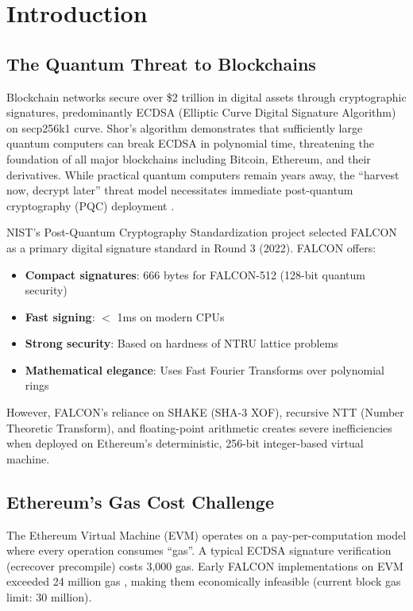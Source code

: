 \section{Introduction}


\subsection{The Quantum Threat to Blockchains}

Blockchain networks secure over \$2 trillion in digital assets through cryptographic signatures, predominantly ECDSA (Elliptic Curve Digital Signature Algorithm) on secp256k1 curve. Shor's algorithm \cite{shor1997polynomial} demonstrates that sufficiently large quantum computers can break ECDSA in polynomial time, threatening the foundation of all major blockchains including Bitcoin, Ethereum, and their derivatives. While practical quantum computers remain years away, the ``harvest now, decrypt later'' threat model necessitates immediate post-quantum cryptography (PQC) deployment \cite{mosca2018cybersecurity}.

NIST's Post-Quantum Cryptography Standardization project selected FALCON \cite{falcon2020} as a primary digital signature standard in Round 3 (2022). FALCON offers:
\begin{itemize}
    \item \textbf{Compact signatures}: 666 bytes for FALCON-512 (128-bit quantum security)
    \item \textbf{Fast signing}: $<$ 1ms on modern CPUs
    \item \textbf{Strong security}: Based on hardness of NTRU lattice problems
    \item \textbf{Mathematical elegance}: Uses Fast Fourier Transforms over polynomial rings
\end{itemize}

However, FALCON's reliance on SHAKE (SHA-3 XOF), recursive NTT (Number Theoretic Transform), and floating-point arithmetic creates severe inefficiencies when deployed on Ethereum's deterministic, 256-bit integer-based virtual machine.

\subsection{Ethereum's Gas Cost Challenge}

The Ethereum Virtual Machine (EVM) operates on a pay-per-computation model where every operation consumes ``gas''. A typical ECDSA signature verification (ecrecover precompile) costs 3,000 gas. Early FALCON implementations on EVM exceeded 24 million gas \cite{tetration2023falcon}, making them economically infeasible (current block gas limit: 30 million).

